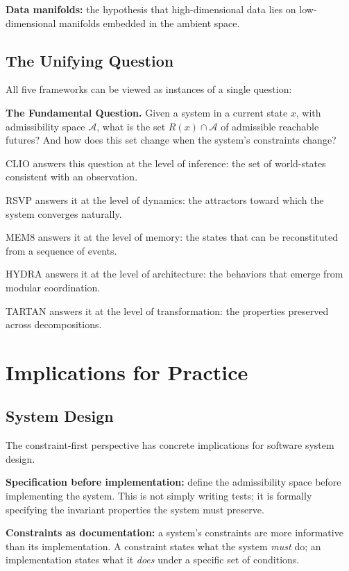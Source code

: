 \documentclass[11pt, a4paper]{article}
\theoremstyle{named}
\begin{document}
\textbf{Data manifolds:} the hypothesis that high-dimensional data
lies on low-dimensional manifolds embedded in the ambient space.

\subsection{The Unifying Question}

All five frameworks can be viewed as instances of a single question:

\begin{keybox}
\textbf{The Fundamental Question.} Given a system in a current state
$x$, with admissibility space $\mathcal{A}$, what is the set
$R(x) \cap \mathcal{A}$ of admissible reachable futures? And how does
this set change when the system's constraints change?
\end{keybox}

CLIO answers this question at the level of inference: the set of
world-states consistent with an observation.

RSVP answers it at the level of dynamics: the attractors toward which
the system converges naturally.

MEM\textbar{}8 answers it at the level of memory: the states that can
be reconstituted from a sequence of events.

HYDRA answers it at the level of architecture: the behaviors that
emerge from modular coordination.

TARTAN answers it at the level of transformation: the properties
preserved across decompositions.

\section{Implications for Practice}

\subsection{System Design}

The constraint-first perspective has concrete implications for
software system design.

\textbf{Specification before implementation:} define the admissibility
space before implementing the system. This is not simply writing
tests; it is formally specifying the invariant properties the system
must preserve.

\textbf{Constraints as documentation:} a system's constraints are
more informative than its implementation. A constraint states what
the system \emph{must} do; an implementation states what it \emph{does}
under a specific set of conditions.
\end{document}

